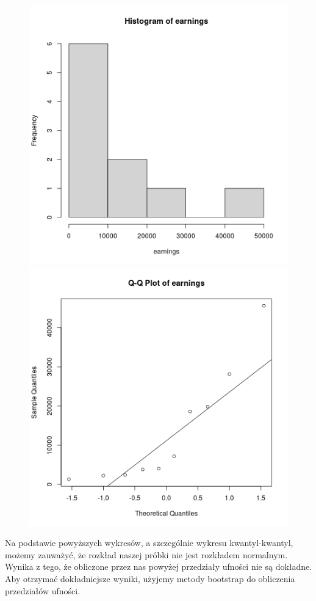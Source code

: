 \documentclass[11pt]{article}
\begin{document}
\begin{figure}[h]
\includegraphics[scale=0.5]{earnings_hist.png}
\includegraphics[scale=0.5]{earnings_qq.png}
\centering
\end{figure}

Na podstawie powyższych wykresów, a szczególnie wykresu kwantyl-kwantyl, możemy zauważyć,
że rozkład naszej próbki nie jest rozkładem normalnym. Wynika z tego, że obliczone przez
nas powyżej przedziały ufności nie są dokładne. Aby otrzymać dokładniejsze wyniki, użyjemy
metody bootstrap do obliczenia przedziałów ufności.
\end{document}
